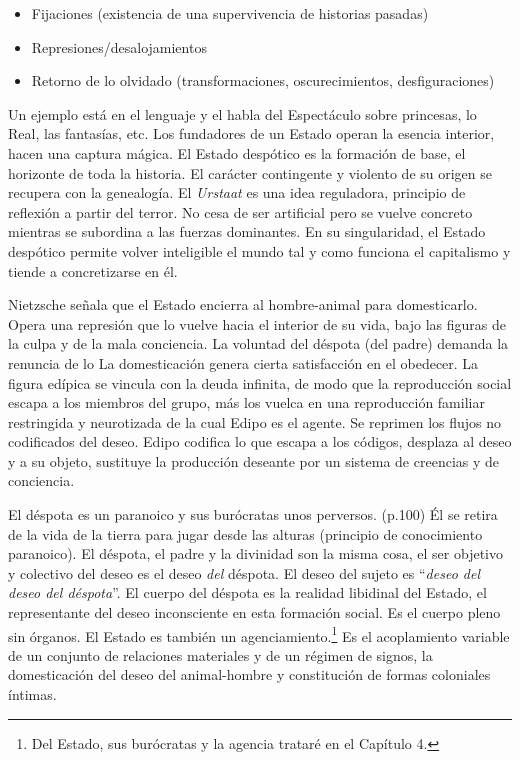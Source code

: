 \begin{itemize}
  \item Fijaciones (existencia de una supervivencia de historias pasadas)
  \item Represiones/desalojamientos
  \item Retorno de lo olvidado (transformaciones, oscurecimientos, desfiguraciones)
\end{itemize}

Un ejemplo está en el lenguaje y el habla del Espectáculo sobre princesas, lo Real, las fantasías, etc. Los fundadores de un Estado operan la esencia interior, hacen una captura mágica. El Estado despótico es la formación de base, el horizonte de toda la historia. El carácter contingente y violento de su origen se recupera con la genealogía. El \emph{Urstaat} es una idea reguladora, principio de reflexión a partir del terror. No cesa de ser artificial pero se vuelve concreto mientras se subordina a las fuerzas dominantes. En su singularidad, el Estado despótico permite volver inteligible el mundo tal y como funciona el capitalismo y tiende a concretizarse en él.

Nietzsche señala que el Estado encierra al hombre-animal para domesticarlo. Opera una represión que lo vuelve hacia el interior de su vida, bajo las figuras de la culpa y de la mala conciencia. La voluntad del déspota (del padre) demanda la renuncia de lo  La domesticación genera cierta satisfacción en el obedecer. La figura edípica se vincula con la deuda infinita, de modo que  la reproducción social escapa a los miembros del grupo, más los vuelca en una reproducción familiar restringida y neurotizada de la cual Edipo es el agente. Se reprimen los flujos no codificados del deseo. Edipo codifica lo que escapa a los códigos, desplaza al deseo y a su objeto, sustituye la producción deseante por un sistema de creencias y de conciencia.

El déspota es un paranoico y sus burócratas unos perversos. (p.100) Él se retira de la vida de la tierra para jugar desde las alturas (principio de conocimiento paranoico). El déspota, el padre y la divinidad son la misma cosa, el ser objetivo y colectivo del deseo es el deseo \emph{del} déspota. El deseo del sujeto es \enquote{\emph{deseo del deseo del déspota}}. El cuerpo del déspota es la realidad libidinal del Estado, el representante del deseo inconsciente en esta formación social. Es el cuerpo pleno sin órganos. El Estado es también un agenciamiento.\footnote{Del Estado, sus burócratas y la agencia trataré en el Capítulo 4.} Es el acoplamiento variable de un conjunto de relaciones materiales y de un régimen de signos, la domesticación del deseo del animal-hombre y constitución de formas coloniales íntimas.

